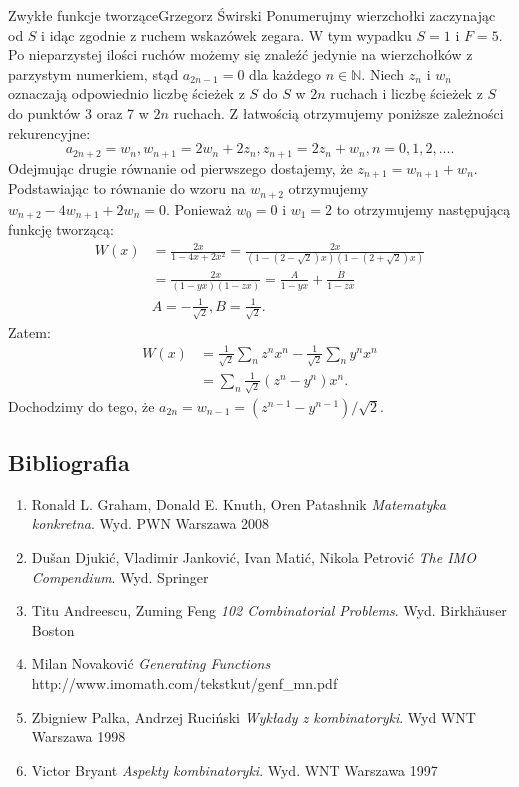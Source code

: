 \begin{referat}{Zwykłe funkcje tworzące}{Grzegorz Świrski}
Ponumerujmy wierzchołki zaczynając od $S$ i idąc zgodnie
z ruchem wskazówek zegara. W tym wypadku $S = 1$ i $F = 5$. Po nieparzystej
ilości ruchów możemy się znaleźć jedynie na wierzchołków z parzystym numerkiem, stąd
$a_{2n-1} = 0$ dla każdego $n \in \mathbb{N}$. Niech $z_n$ i $w_n$ oznaczają odpowiednio
liczbę ścieżek z $S$ do $S$ w $2n$ ruchach i liczbę ścieżek z $S$ do punktów 3 oraz 7 w $2n$
ruchach. Z łatwością otrzymujemy poniższe zależności rekurencyjne:
$$a_{2n+2} = w_n, w_{n+1} = 2w_n + 2z_n, z_{n+1} = 2z_n + w_n, n = 0,1,2,... .$$
Odejmując drugie równanie od pierwszego dostajemy, że $z_{n+1} = w_{n+1} + w_n$.
Podstawiając to równanie do wzoru na $w_{n+2}$ otrzymujemy $w_{n+2} - 4w_{n+1} + 2w_n = 0$.
Ponieważ $w_0 = 0$ i $w_1 = 2$ to otrzymujemy następującą funkcję tworzącą:
\begin{align*}
  W(x) &= \frac{2x}{1-4x+2x^2} = \frac{2x}{(1-(2-\sqrt{2})x)(1-(2+\sqrt{2})x)} \\
       &= \frac{2x}{(1-yx)(1-zx)} = \frac{A}{1-yx} + \frac{B}{1-zx} \\
       &A = - \frac{1}{\sqrt{2}}, B = \frac{1}{\sqrt{2}}.
\end{align*}
Zatem:
\begin{align*}
  W(x) &= \frac{1}{\sqrt{2}} \sum_n z^n x^n - \frac{1}{\sqrt{2}} \sum_n y^n x^n \\
       &= \sum_n \frac{1}{\sqrt{2}} (z^n - y^n)x^n.
\end{align*}
Dochodzimy do tego, że $a_{2n} = w_{n-1} = (z^{n-1} - y^{n-1}) / \sqrt{2}$.

\end{referat}

\subsection{Bibliografia}
\begin{enumerate}
  \item Ronald L. Graham, Donald E. Knuth, Oren Patashnik \textit{Matematyka konkretna}. Wyd. PWN Warszawa 2008
  \item Dušan Djukić, Vladimir Janković, Ivan Matić, Nikola Petrović \textit{The IMO Compendium}. Wyd. Springer
  \item Titu Andreescu, Zuming Feng \textit{102 Combinatorial Problems}. Wyd. Birkhäuser Boston
  \item Milan Novaković \textit{Generating Functions} \\
    http://www.imomath.com/tekstkut/genf\_mn.pdf
  \item Zbigniew Palka, Andrzej Ruciński \textit{Wykłady z kombinatoryki}. Wyd WNT Warszawa 1998
  \item Victor Bryant \textit{Aspekty kombinatoryki}. Wyd. WNT Warszawa 1997
\end{enumerate}

